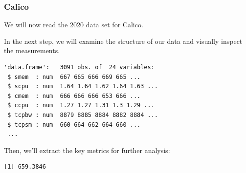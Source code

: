 \subsubsection{Calico}

We will now read the 2020 data set for Calico.

\begin{Shaded}
\begin{Highlighting}[]
\OtherTok{\textless{}{-}} 
\OtherTok{\textless{}{-}} \NormalTok{(}\NormalTok{,}\NormalTok{))}
\end{Highlighting}
\end{Shaded}

In the next step, we will examine the structure of our data and visually
inspect the measurements.

\begin{Shaded}
\begin{Highlighting}[]
\end{Highlighting}
\end{Shaded}

\begin{verbatim}
'data.frame':   3091 obs. of  24 variables:
 $ smem  : num  667 665 666 669 665 ...
 $ scpu  : num  1.64 1.64 1.62 1.64 1.63 ...
 $ cmem  : num  666 666 666 653 666 ...
 $ ccpu  : num  1.27 1.27 1.31 1.3 1.29 ...
 $ tcpbw : num  8879 8885 8884 8882 8884 ...
 $ tcpsm : num  660 664 662 664 660 ...
 ...
\end{verbatim}

Then, we'll extract the key metrics for further analysis:

\begin{Shaded}
\begin{Highlighting}[]
\SpecialCharTok{\$}
\end{Highlighting}
\end{Shaded}

\begin{verbatim}
[1] 659.3846
\end{verbatim}

\begin{Shaded}
\begin{Highlighting}[]
\SpecialCharTok{\$}
\end{Highlighting}
\end{Shaded}

